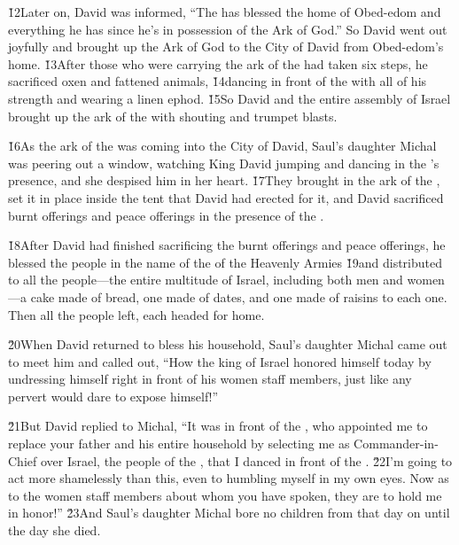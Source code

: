 \v{12}Later on, David was informed, ``The  has blessed the home of Obed-edom and everything he has since he's in possession of the Ark of God.'' So David went out joyfully and brought up the Ark of God to the City of David from Obed-edom's home. \v{13}After those who were carrying the ark of the  had taken six steps, he sacrificed oxen and fattened animals, \v{14}dancing in front of the  with all of his strength and wearing a linen ephod. \v{15}So David and the entire assembly of Israel brought up the ark of the  with shouting and trumpet blasts.

\v{16}As the ark of the  was coming into the City of David, Saul's daughter Michal was peering out a window, watching King David jumping and dancing in the 's presence, and she despised him in her heart. \v{17}They brought in the ark of the , set it in place inside the tent that David had erected for it, and David sacrificed burnt offerings and peace offerings in the presence of the .

\v{18}After David had finished sacrificing the burnt offerings and peace offerings, he blessed the people in the name of the  of the Heavenly Armies \v{19}and distributed to all the people---the entire multitude of Israel, including both men and women---a cake made of bread, one made of dates, and one made of raisins to each one. Then all the people left, each headed for home.

\v{20}When David returned to bless his household, Saul's daughter Michal came out to meet him and called out, ``How the king of Israel honored himself today by undressing himself right in front of his women staff members, just like any pervert would dare to expose himself!''

\v{21}But David replied to Michal, ``It was in front of the , who appointed me to replace your father and his entire household by selecting me as Commander-in-Chief over Israel, the people of the , that I danced in front of the . \v{22}I'm going to act more shamelessly than this, even to humbling myself in my own eyes. Now as to the women staff members about whom you have spoken, they are to hold me in honor!'' \v{23}And Saul's daughter Michal bore no children from that day on until the day she died.

